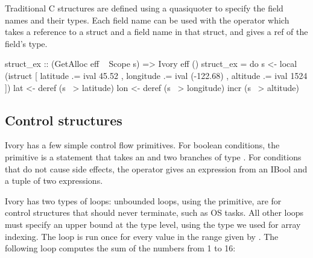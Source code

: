 Traditional C structures are defined using a quasiquoter to specify the field
names and their types. Each field name can be used with the \cd{~>} operator
which takes a reference to a struct and a field name in that struct, and gives
a ref of the field's type.

\begin{code}

struct_ex :: (GetAlloc eff ~ Scope s) => Ivory eff ()
struct_ex = do
  s <- local (istruct [ latitude .= ival 45.52
                      , longitude .= ival (-122.68)
                      , altitude .= ival 1524 ])
  lat <- deref (s ~> latitude)
  lon <- deref (s ~> longitude)
  incr (s ~> altitude)
\end{code}


\subsection{Control structures}

Ivory has a few simple control flow primitives. For boolean conditions,
the  primitive is a statement that takes an  and two
branches of type . For conditions that do not cause side
effects, the  operator gives an expression from an IBool and a tuple
of two expressions.


Ivory has two types of loops: unbounded loops, using the  primitive,
are for control structures that should never terminate, such as OS tasks. All
other loops must specify an upper bound at the type level, using the  type
we used for array indexing. The  loop is run once for every value
in the range given by . The following loop computes the sum of the
numbers from 1 to 16:


